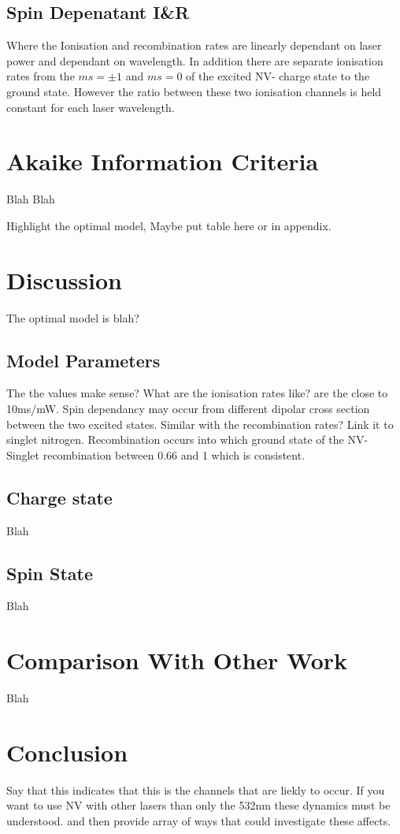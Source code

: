 \documentclass[preprint,prl,twocolumn]{revtex4}
\begin{document}
\subsection{Spin Depenatant I\&R}
Where the Ionisation and recombination rates are linearly dependant on laser power and dependant on wavelength. In addition there are separate ionisation rates from the $ms=\pm1$ and $ms=0$ of the excited NV- charge state to the ground state. However the ratio between these two ionisation channels is held constant for each laser wavelength.


\section{Akaike Information Criteria}
Blah Blah

Highlight the optimal model, Maybe put table here or in appendix.

\section{Discussion}
The optimal model is blah?

\subsection{Model Parameters}
The the values make sense?
What are the ionisation rates like? are the close to 10ms/mW. Spin dependancy may occur from different dipolar cross section between the two excited states.
Similar with the recombination rates? Link it to singlet nitrogen.
Recombination occurs into which ground state of the NV- 
Singlet recombination between 0.66 and 1 which is consistent.


\subsection{Charge state}
Blah
\subsection{Spin State}
Blah

\section{Comparison With Other Work}
Blah

\section{Conclusion}
Say that this indicates that this is the channels that are liekly to occur. If you want to use NV with other lasers than only the 532nm these dynamics must be understood. and then provide array of ways that could investigate these affects.
    
\end{document}
